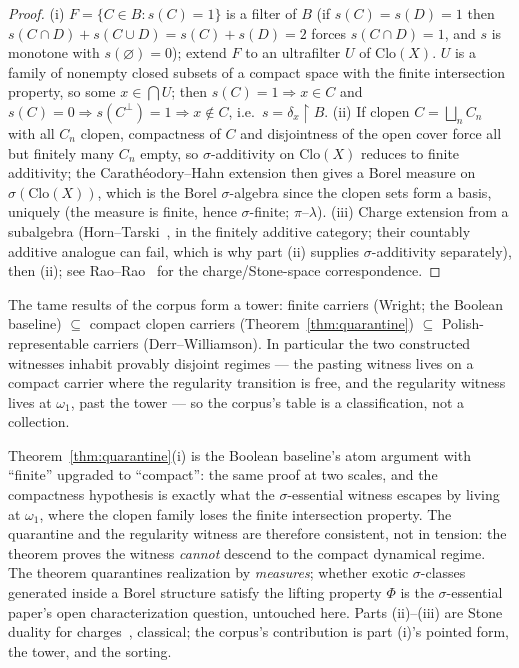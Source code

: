 \begin{proof}
(i) $F=\{C \in B : s(C)=1\}$ is a filter of $B$ (if $s(C)=s(D)=1$ then
$s(C\cap D) + s(C\cup D) = s(C)+s(D) = 2$ forces $s(C\cap D)=1$, and $s$ is
monotone with $s(\varnothing)=0$); extend $F$ to an ultrafilter $U$ of
$\mathrm{Clo}(X)$. $U$ is a family of nonempty closed subsets of a compact space
with the finite intersection property, so some $x \in \bigcap U$; then
$s(C)=1 \Rightarrow x \in C$ and
$s(C)=0 \Rightarrow s(C^{\perp})=1 \Rightarrow x \notin C$, i.e.\
$s=\delta_x\!\restriction\!B$. (ii) If clopen $C = \bigsqcup_n C_n$ with all
$C_n$ clopen, compactness of $C$ and disjointness of the open cover force all but
finitely many $C_n$ empty, so $\sigma$-additivity on $\mathrm{Clo}(X)$ reduces to
finite additivity; the Carath\'eodory--Hahn extension then gives a Borel measure
on $\sigma(\mathrm{Clo}(X))$, which is the Borel $\sigma$-algebra since the clopen
sets form a basis, uniquely (the measure is finite, hence $\sigma$-finite; $\pi$--$\lambda$).
(iii) Charge extension from a subalgebra
(Horn--Tarski~\cite{HornTarski1948}, in the finitely additive category; their
countably additive analogue can fail, which is why part (ii) supplies
$\sigma$-additivity separately), then (ii); see Rao--Rao~\cite{RaoRao1983} for the
charge/Stone-space correspondence.
\end{proof}

\begin{corollary}\label{cor:tower}
The tame results of the corpus form a tower:
finite carriers \textup{(Wright; the Boolean baseline)} $\subseteq$
compact clopen carriers \textup{(Theorem~\ref{thm:quarantine})} $\subseteq$
Polish-representable carriers \textup{(Derr--Williamson)}. In particular the two
constructed witnesses inhabit provably disjoint regimes --- the pasting witness
lives on a compact carrier where the regularity transition is free, and the
regularity witness lives at $\omega_1$, past the tower --- so the corpus's table
is a classification, not a collection.
\end{corollary}

\begin{remark}\label{rem:quarantine-scope}
Theorem~\ref{thm:quarantine}(i) is the Boolean baseline's atom argument with
``finite'' upgraded to ``compact'': the same proof at two scales, and the
compactness hypothesis is exactly what the $\sigma$-essential witness escapes by
living at $\omega_1$, where the clopen family loses the finite intersection
property. The quarantine and the regularity witness are therefore consistent, not
in tension: the theorem proves the witness \emph{cannot} descend to the compact
dynamical regime. The theorem quarantines realization by \emph{measures}; whether
exotic $\sigma$-classes generated inside a Borel structure satisfy the lifting
property $\Phi$ is the $\sigma$-essential paper's open characterization question,
untouched here. Parts (ii)--(iii) are Stone duality for
charges~\cite{HornTarski1948,RaoRao1983}, classical; the corpus's contribution is
part (i)'s pointed form, the tower, and the sorting.
\end{remark}

